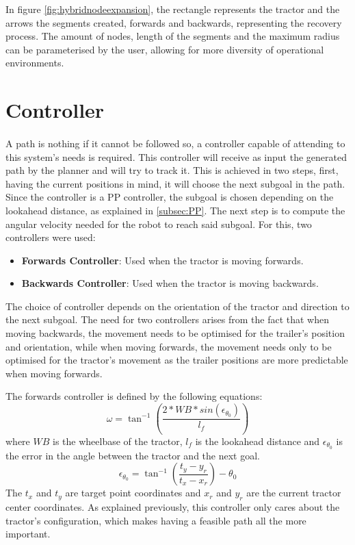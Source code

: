 In figure \ref{fig:hybridnodeexpansion}, the rectangle represents the tractor and the 
arrows the segments created, forwards and backwards, representing the recovery process. 
The amount of nodes, length of the segments and the maximum radius can be parameterised by the user, 
allowing for more diversity of operational environments.

\section{Controller}
\label{sec:controller}
\paragraph{}A path is nothing if it cannot be followed so, a controller capable of 
attending to this system's needs is required. This controller will 
receive as input the generated path by the planner and will try to track it. 
This is achieved in two steps, first, having the current positions in mind, 
it will choose the next subgoal in the path. Since the controller is 
a \gls{PP} controller, the subgoal is chosen depending on the lookahead distance, 
as explained in \ref{subsec:PP}. The next step is to compute the angular velocity needed 
for the robot to reach said subgoal. For this, two controllers were used:
\begin{itemize}
    \item \textbf{Forwards Controller}: Used when the tractor is moving forwards.
    \item \textbf{Backwards Controller}: Used when the tractor is moving backwards.
\end{itemize}
The choice of controller depends on the orientation of the tractor and 
direction to the next subgoal. The need for two controllers arises from 
the fact that when moving backwards, the movement needs to be optimised 
for the trailer's position and orientation, while when moving forwards, 
the movement needs only to be optimised for the tractor's movement as the 
trailer positions are more predictable when moving forwards.

The forwards controller is defined by the following equations:
\begin{equation}
    \omega = \tan^{-1}\left(\frac{2*WB*sin(\epsilon_{\theta_0})}{l_f}\right)
\end{equation}
where $WB$ is the wheelbase of the tractor, $l_f$ is the lookahead distance and 
$\epsilon_{\theta_0}$ is the error in the angle between the tractor and the next goal.
\begin{equation}
    \epsilon_{\theta_0} = \tan^{-1}\left(\frac{t_y - y_r}{t_x - x_r}\right) - \theta_0
\end{equation}
The $t_x$ and $t_y$ are target point coordinates and $x_r$ and $y_r$ are the current tractor center coordinates. 
As explained previously, this controller only cares about the tractor's 
configuration, which makes having a feasible path all the more important.

